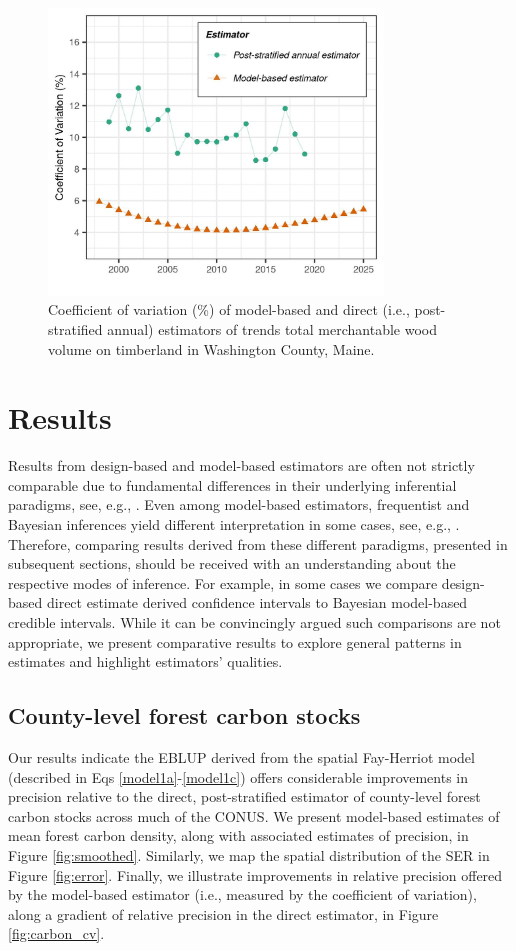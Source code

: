 \documentclass[11pt]{article}
\begin{document}
\begin{figure}[t!]
    \centering
    \includegraphics[width=3.5in]{figure5.jpg}
    \caption{Coefficient of variation (\%) of model-based and direct (i.e., post-stratified annual) estimators of trends total merchantable wood volume on timberland in Washington County, Maine.}
    \label{fig:volume_cv}
\end{figure}

\section*{Results}

Results from design-based and model-based estimators are often not strictly comparable due to fundamental differences in their underlying inferential paradigms, see, e.g., \citet{little2004model}. Even among model-based estimators, frequentist and Bayesian inferences yield different interpretation in some cases, see, e.g., \citet{gelmanbda04bda}. Therefore, comparing results derived from these different paradigms, presented in subsequent sections, should be received with an understanding about the respective modes of inference. For example, in some cases we compare design-based direct estimate derived confidence intervals to Bayesian model-based credible intervals. While it can be convincingly argued such comparisons are not appropriate, we present comparative results to explore general patterns in estimates and highlight estimators' qualities.

\subsection*{County-level forest carbon stocks}
Our results indicate the EBLUP derived from the spatial Fay-Herriot model (described in Eqs \ref{model1a}-\ref{model1c}) offers considerable improvements in precision relative to the direct, post-stratified estimator of county-level forest carbon stocks across much of the CONUS. We present model-based estimates of mean forest carbon density, along with associated estimates of precision, in Figure \ref{fig:smoothed}. Similarly, we map the spatial distribution of the SER in Figure \ref{fig:error}. Finally, we illustrate improvements in relative precision offered by the model-based estimator (i.e., measured by the coefficient of variation), along a gradient of relative precision in the direct estimator, in Figure \ref{fig:carbon_cv}.
\end{document}
